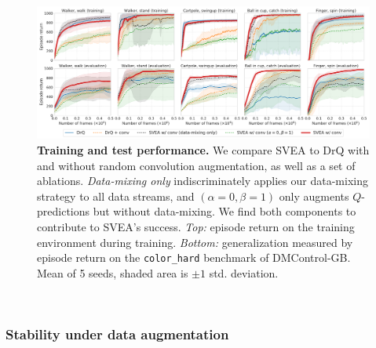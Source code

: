 \begin{figure}[H]
    \centering
    \includegraphics[width=\textwidth]{figures/drq_conv.pdf}
    \vspace{-0.2in}
    \caption{\textbf{Training and test performance.} We compare SVEA to DrQ with and without random convolution augmentation, as well as a set of ablations. \textit{Data-mixing only} indiscriminately applies our data-mixing strategy to all data streams, and $(\alpha=0, \beta=1)$ only augments $Q$-predictions but without data-mixing. We find both components to contribute to SVEA's success. \textit{Top:} episode return on the training environment during training. \textit{Bottom:} generalization measured by episode return on the \texttt{color\_hard} benchmark of DMControl-GB. Mean of 5 seeds, shaded area is $\pm1$ std. deviation.}
    \label{fig:dmc-conv}
    \vspace{-0.125in}
\end{figure}\\

\subsubsection*{\textbf{Stability under data augmentation}}
\label{sec:stability-under-data-augmentation}

